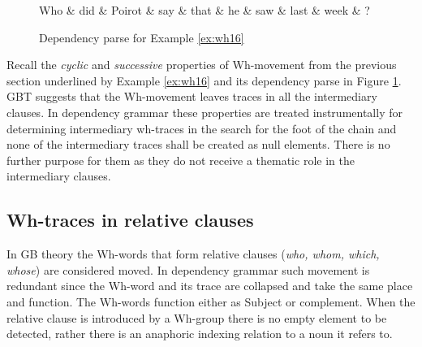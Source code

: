 \begin{figure}[H]
	\centering
	\begin{dependency}
		\begin{deptext}[]
			Who \& did \& Poirot \& say \& that \& he \& saw \& last \& week \& ?\\
		\end{deptext}
	\end{dependency}
	\caption{Dependency parse for Example \ref{ex:wh16}}
	\label{fig:e17}
\end{figure}

Recall the \textit{cyclic} and \textit{successive} properties of Wh-movement from the previous section underlined by Example \ref{ex:wh16} and its dependency parse in Figure \ref{fig:e17}. GBT suggests that the Wh-movement leaves traces in all the intermediary clauses. In dependency grammar these properties are treated instrumentally for determining intermediary wh-traces in the search for the foot of the chain and none of the intermediary traces shall be created as null elements. There is no further purpose for them as they do not receive a thematic role in the intermediary clauses. 

\subsection{Wh-traces in relative clauses}
\label{sec:wh-traces-relative}
In GB theory the Wh-words that form relative clauses (\textit{who, whom, which, whose}) are considered moved. In dependency grammar such movement is redundant since the Wh-word and its trace are collapsed and take the same place and function. The Wh-words function either as Subject or complement. When the relative clause is introduced by a Wh-group there is no empty element to be detected, rather there is an anaphoric indexing relation to a noun it refers to. 


